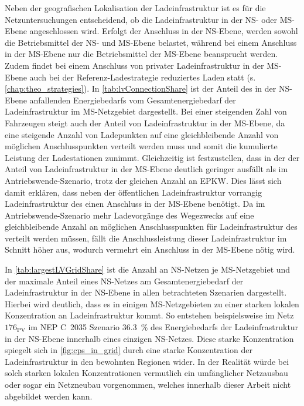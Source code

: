 Neben der geo­gra­fischen Lokalisation der Ladeinfrastruktur ist es für die Netzuntersuchungen entscheidend, ob die Ladeinfrastruktur in der \gls{NS}- oder \gls{MS}-Ebene angeschlossen wird.
Erfolgt der Anschluss in der \gls{NS}-Ebene, werden sowohl die Betriebsmittel der \gls{NS}- und \gls{MS}-Ebene belastet, während bei einem Anschluss in der \gls{MS}-Ebene nur die Betriebsmittel der \gls{MS}-Ebene beansprucht werden.
Zudem findet bei einem Anschluss von privater Ladeinfrastruktur in der \gls{MS}-Ebene auch bei der Referenz-Ladestrategie reduziertes Laden statt (s. \autoref{chap:theo_strategies}).
In \autoref{tab:lvConnectionShare} ist der Anteil des in der \gls{NS}-Ebene anfallenden Energiebedarfs vom Gesamtenergiebedarf der Ladeinfrastruktur im \gls{MS}-Netzgebiet dargestellt.
Bei einer steigenden Zahl von Fahrzeugen steigt auch der Anteil von Ladeinfrastruktur in der \gls{MS}-Ebene, da eine steigende Anzahl von Ladepunkten auf eine gleichbleibende Anzahl von möglichen Anschlusspunkten verteilt werden muss und somit die kumulierte Leistung der Ladestationen zunimmt.
Gleichzeitig ist festzustellen, dass in der \SzeFirmenparkplatz der Anteil von Ladeinfrastruktur in der \gls{MS}-Ebene deutlich geringer ausfällt als im Antriebswende-Szenario, trotz der gleichen Anzahl an \gls{EPKW}.
Dies lässt sich damit erklären, dass neben der öffentlichen Ladeinfrastruktur vorrangig Ladeinfrastruktur des \UC \Firmeparkplatz einen Anschluss in der \gls{MS}-Ebene benötigt.
Da im Antriebswende-Szenario mehr Ladevorgänge des Wegezwecks \Arbeit auf eine gleichbleibende Anzahl an möglichen Anschlusspunkten für Ladeinfrastruktur des \UC \Firmeparkplatz verteilt werden müssen, fällt die Anschlussleistung dieser Ladeinfrastruktur im Schnitt höher aus, wodurch vermehrt ein Anschluss in der \gls{MS}-Ebene nötig wird.



In \autoref{tab:largestLVGridShare} ist die Anzahl an \gls{NS}-Netzen je \gls{MS}-Netzgebiet und der maximale Anteil eines \gls{NS}-Netzes am Gesamtenergiebedarf der Ladeinfrastruktur in der \gls{NS}-Ebene in allen betrachteten Szenarien dargestellt.
Hierbei wird deutlich, dass es in einigen \gls{MS}-Netzgebieten zu einer starken lokalen Konzentration an Ladeinfrastruktur kommt.
So entstehen beispielsweise im Netz \(176_{\text{PV}}\) im \gls{NEP} C~\num{2035} Szenario \SI{36.3}{\percent} des Energiebedarfs der Ladeinfrastruktur in der \gls{NS}-Ebene innerhalb eines einzigen \gls{NS}-Netzes.
Diese starke Konzentration spiegelt sich in \autoref{fig:cps_in_grid} durch eine starke Konzentration der Ladeinfrastruktur in den bewohnten Regionen wider.
In der Realität würde bei solch starken lokalen Konzentrationen vermutlich ein umfänglicher Netzausbau oder sogar ein Netzneubau vorgenommen, welches innerhalb dieser Arbeit nicht abgebildet werden kann.

